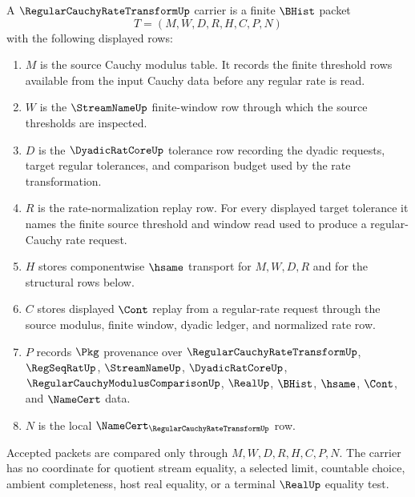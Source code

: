 \begin{definition}
\label{def:regular-cauchy-rate-transform-carrier}
A $\RegularCauchyRateTransformUp$ carrier is a finite $\BHist$ packet
$$
T=(M,W,D,R,H,C,P,N)
$$
with the following displayed rows:
\begin{enumerate}
\item $M$ is the source Cauchy modulus table. It records the finite threshold rows available from the input Cauchy data before any regular rate is read.
\item $W$ is the $\StreamNameUp$ finite-window row through which the source thresholds are inspected.
\item $D$ is the $\DyadicRatCoreUp$ tolerance row recording the dyadic requests, target regular tolerances, and comparison budget used by the rate transformation.
\item $R$ is the rate-normalization replay row. For every displayed target tolerance it names the finite source threshold and window read used to produce a regular-Cauchy rate request.
\item $H$ stores componentwise $\hsame$ transport for $M,W,D,R$ and for the structural rows below.
\item $C$ stores displayed $\Cont$ replay from a regular-rate request through the source modulus, finite window, dyadic ledger, and normalized rate row.
\item $P$ records $\Pkg$ provenance over $\RegularCauchyRateTransformUp$, $\RegSeqRatUp$, $\StreamNameUp$, $\DyadicRatCoreUp$, $\RegularCauchyModulusComparisonUp$, $\RealUp$, $\BHist$, $\hsame$, $\Cont$, and $\NameCert$ data.
\item $N$ is the local $\NameCert_{\RegularCauchyRateTransformUp}$ row.
\end{enumerate}
Accepted packets are compared only through $M,W,D,R,H,C,P,N$. The carrier has no coordinate for quotient stream equality, a selected limit, countable choice, ambient completeness, host real equality, or a terminal $\RealUp$ equality test.
\end{definition}

